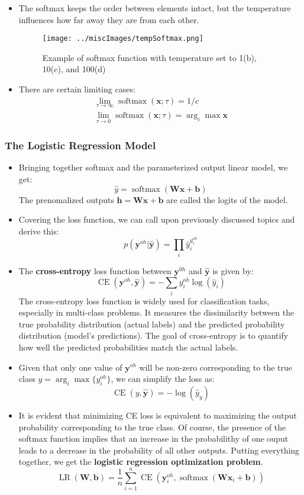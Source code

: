 \documentclass{article}
\newcommand{\tbf}[1]{\textbf{#1}}
\newcommand{\mbf}[1]{\mathbf{#1}}
\begin{document}
\begin{itemize}
        \item The softmax keeps the order between elements intact, but the temperature influences how far away they are from each other.
        \begin{figure}[h]
            \centering
            \texttt{[image: ../miscImages/tempSoftmax.png]} 
            \caption{Example of softmax function with temperature set to 1(b), 10(c), and 100(d)}
            \label{fig:example}
        \end{figure}
        \item There are certain limiting cases:
        \begin{align*}
            \lim_{\tau \rightarrow \infty} \operatorname{softmax}(\mbf{x};\tau)= 1/c \\
            \lim_{\tau \rightarrow 0} \operatorname{softmax}(\mbf{x};\tau) = \arg _i \max \mbf{x}
        \end{align*}
    \end{itemize}
    \subsubsection{The Logistic Regression Model}
    \begin{itemize}
        \item Bringing together softmax and the parameterized output linear model, we get:
        \[\hat{y}=\operatorname{softmax}(\mbf{Wx + b})\]
        The prenomalized outputs $\mbf{h=Wx+b}$ are called the logits of the model.
        \item Covering the loss function, we can call upon previously discussed topics and derive this:
        \[p(\mbf{y}^{oh}|\mbf{\hat{y}}) = \prod_i \hat{y}_i^{y_i^{oh}}\]
        \item The \tbf{cross-entropy} loss function between $\mbf{y}^{0h}$ and $\mbf{\hat{y}}$ is given by:
        \[\operatorname{CE}(\mbf{y}^{oh}, \mbf{\hat{y}})= - \sum _i y_i^{oh} \log(\hat{y}_i)\]
        The cross-entropy loss function is widely used for classification tasks, especially in multi-class problems. 
        It measures the dissimilarity between the true probability distribution (actual labels) and the predicted probability distribution (model's predictions).
        The goal of cross-entropy is to quantify how well the predicted probabilities match the actual labels.
        \item Given that only one value of $\mbf{y}^{oh}$ will be non-zero corresponding to the true class $y = \arg _i \max \{y_i^{oh}\}$, we can simplify the
        loss as:
        \[\operatorname{CE}(y,\mbf{\hat{y}})=- \log (\hat{y}_y)\]
        \item It is evident that minimizing CE loss is equivalent to maximizing the output probability corresponding to the true class. Of course, the presence 
        of the softmax function implies that an increase in the probabilithy of one ouput leads to a decrease in the probability of all other outputs. Putting everything together,
        we get the \tbf{logistic regression optimization problem}.
        \[\operatorname{LR}(\mbf{W,b}) = \frac{1}{n}\sum_{i=1}^n\operatorname{CE}(\mbf{y}_i^{oh}, \operatorname{softmax}(\mbf{Wx}_i+\mbf{b}))\]
    \end{itemize}
\end{document}
